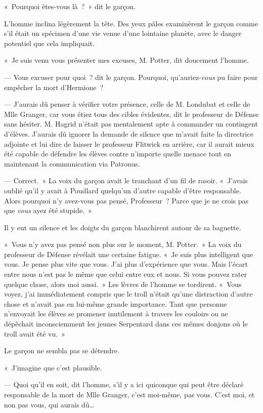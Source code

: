 «~Pourquoi êtes-vous là~?~» dit le garçon.

L'homme inclina légèrement la tête. Des yeux pâles examinèrent le garçon comme s'il était un spécimen d'une vie venue d'une lointaine planète, avec le danger potentiel que cela impliquait.

«~Je suis venu vous présenter mes excuses, M. Potter, dit doucement l'homme.

--- Vous excuser pour quoi~? dit le garçon. Pourquoi, qu'auriez-\emph{vous} pu faire pour empêcher la mort d'Hermione~?

--- J'aurais dû penser à vérifier votre présence, celle de M. Londubat et celle de Mlle Granger, car vous étiez tous des cibles évidentes, dit le professeur de Défense sans hésiter. M. Hagrid n'était pas mentalement apte à commander un contingent d'élèves. J'aurais dû ignorer la demande de silence que m'avait faite la directrice adjointe et lui dire de laisser le professeur Flitwick en arrière, car il aurait mieux été capable de défendre les élèves contre n'importe quelle menace tout en maintenant la communication via Patronus.

--- Correct.~» La voix du garçon avait le tranchant d'un fil de rasoir. «~J'avais oublié qu'il y avait à Poudlard quelqu'un d'autre capable d'être responsable. Alors pourquoi n'y avez-vous pas pensé, Professeur~? Parce que je ne crois pas que \emph{vous} ayez été stupide.~»

Il y eut un silence et les doigts du garçon blanchirent autour de sa baguette.

«~Vous n'y avez pas pensé non plus sur le moment, M. Potter.~» La voix du professeur de Défense révélait une certaine fatigue. «~Je suis plus intelligent que vous. Je pense plus vite que vous. J'ai plus d'expérience que vous. Mais l'écart entre nous n'est pas le même que celui entre eux et nous. Si vous pouvez rater quelque chose, alors moi aussi.~» Les lèvres de l'homme se tordirent. «~Vous voyez, j'ai immédiatement compris que le troll n'était qu'une distraction d'autre chose et n'avait pas en lui-même grande importance. Tant que personne n'envoyait les élèves se promener inutilement à travers les couloirs ou ne dépêchait inconsciemment les jeunes Serpentard dans ces mêmes donjons où le troll avait été vu.~»

Le garçon ne sembla pas se détendre.

«~J'imagine que c'est plausible.

--- Quoi qu'il en soit, dit l'homme, s'il y a ici quiconque qui peut être déclaré responsable de la mort de Mlle Granger, c'est moi-même, pas vous. C'est moi, et non pas vous, qui aurais dû…

